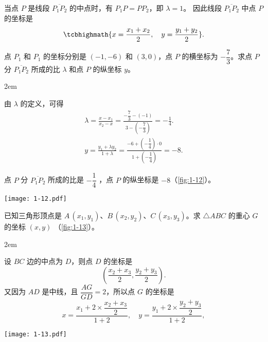 当点 $P$ 是线段 $\overline{P_1P_2}$ 的中点时，有 $P_1P=PP_2$，即 $\lambda = 1$。
因此线段 $\overline{P_1P_2}$ 中点 $P$ 的坐标是
\[ \tcbhighmath{x=\frac{x_1+x_2}{2},\quad y=\frac{y_1+y_2}{2}}.\]
\begin{example}
点 $P_1$ 和 $P_1$ 的坐标分别是 $(-1,-6)$ 和 $(3,0)$，点 $P$ 的横坐标为 $-\dfrac{7}{3}$。求点 $P$ 分 $\overline{P_1P_2}$ 所成的比 $\lambda$ 和点 $P$ 的纵坐标 $y$。
\end{example}
\noindent
\begin{minipage}{0.65\linewidth}\parindent2em
\begin{solution}
  由 $\lambda$ 的定义，可得
  \begin{gather*} 
    \lambda=\frac{x-x_1}{x_2-x}=\frac{-\dfrac{7}{3}-(-1)}{3-\left(-\dfrac{7}{3}\right)}=-\frac{1}{4}.\\
    y=\frac{y_1+\lambda y_2}{1+\lambda}=\frac{-6+ \left( -\dfrac{1}{4}\right)\cdot 0}{1+\left( -\dfrac{1}{4}\right)}=-8.
  \end{gather*}

  点 $P$ 分 $\overline{P_1P_2}$ 所成的比是 $-\dfrac{1}{4}$ ，点 $P$ 的纵坐标是 $-8$（\cref{fig:1-12}）。
\end{solution}
\end{minipage}\hfill
\begin{minipage}{0.3\linewidth}\centering
\begin{figurehere}
  \texttt{[image: 1-12.pdf]}
  \caption{}\label{fig:1-12}
\end{figurehere}
\end{minipage}

\medskip
\begin{example}
  已知三角形顶点是 $A\,(x_1,y_1)$、$B\,(x_2,y_2)$、$C\,(x_3,y_3)$。求 $\triangle ABC$ 的重心 $G$ 的坐标 $(x,y)$ （\cref{fig:1-13}）。
\end{example}
\noindent
\begin{minipage}{0.65\linewidth}\parindent2em
\begin{solution}
  设 $BC$ 边的中点为 $D$，则点 $D$ 的坐标是
  \[ \left(\frac{x_2+x_3}{2},\frac{y_2+y_3}{2}\right).\]
  又因为 $AD$ 是中线，且 $\dfrac{AG}{GD} = 2$，所以点 $G$ 的坐标是
  \[
    x=\frac{x_1+2\times\dfrac{x_2+x_3}{2}}{1+2},\quad
    y=\frac{y_1+2\times\dfrac{y_2+y_3}{2}}{1+2}, 
  \]
\end{solution}
\end{minipage}\hfill
\begin{minipage}{0.3\linewidth}\centering
\begin{figurehere}
  \texttt{[image: 1-13.pdf]}
  \caption{}\label{fig:1-13}
\end{figurehere}
\end{minipage}


